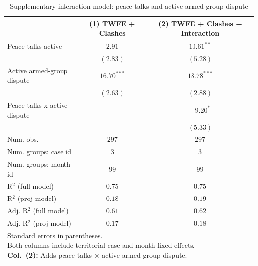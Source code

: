 
\begin{table}
\caption{Supplementary interaction model: peace talks and active armed-group dispute}
\begin{center}
\begin{tabular}{l c c}
\toprule
 & (1) TWFE + Clashes & (2) TWFE + Clashes + Interaction \\
\midrule
Peace talks active           & $2.91$        & $10.61^{**}$  \\
                             & $(2.83)$      & $(5.28)$      \\
Active armed-group dispute   & $16.70^{***}$ & $18.78^{***}$ \\
                             & $(2.63)$      & $(2.88)$      \\
Peace talks x active dispute &               & $-9.20^{*}$   \\
                             &               & $(5.33)$      \\
\midrule
Num. obs.                    & $297$         & $297$         \\
Num. groups: case id        & $3$           & $3$           \\
Num. groups: month id       & $99$          & $99$          \\
R$^2$ (full model)           & $0.75$        & $0.75$        \\
R$^2$ (proj model)           & $0.18$        & $0.19$        \\
Adj. R$^2$ (full model)      & $0.61$        & $0.62$        \\
Adj. R$^2$ (proj model)      & $0.17$        & $0.18$        \\
\bottomrule
\multicolumn{3}{l}{\scriptsize{\parbox{\linewidth}{Standard errors in parentheses.\\[0.35em] Both columns include territorial-case and month fixed effects.\\[0.35em] \textbf{Col.~(2):} Adds peace talks $\times$ active armed-group dispute.}}}
\end{tabular}
\label{tab:twfe_interaction}
\end{center}
\end{table}
